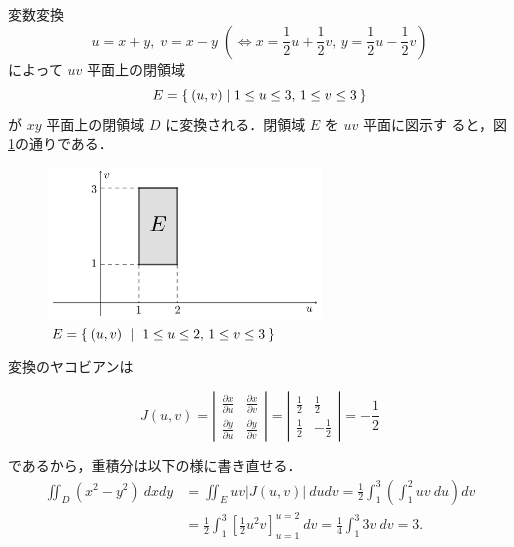 \documentclass[11pt, uplatex, dvipdfmx]{jsarticle}
\begin{document}
\begin{enumerate}[(1)]
     変数変換
     \[
       u=x+y, \; v=x-y \; \left( \Leftrightarrow x= \frac{1}{2}u+\frac{1}{2}v, \, y=\frac{1}{2}u - \frac{1}{2}v \right)
     \]
     によって $uv$ 平面上の閉領域
     \[
       E=\Set{ (u,v)  |  1 \leq u \leq 3, \, 1 \leq v \leq 3}
     \]
     が $xy$ 平面上の閉領域 $D$ に変換される．閉領域 $E$ を $uv$ 平面に図示す
     ると，図\ref{fig:no8uv}の通りである．
     \begin{figure}[h]
       \centering
       \includegraphics[height=4cm]{./pictures/no8uv.pdf}
       \caption{$E=\Set{(u,v) \ | \ 1 \leq u \leq 2, \, 1 \leq v \leq 3 }$}\label{fig:no8uv}
     \end{figure}
     
     変換のヤコビアンは
     \begin{spacing}{1.3}
       \[
         J(u, v) = \left|
           \begin{array}{cc}
             \frac{\partial x}{\partial u} & \frac{\partial x}{\partial v}\\
             \frac{\partial y}{\partial u} & \frac{\partial y}{\partial v}
           \end{array}
         \right| = \left|
           \begin{array}{rr}
             \frac{1}{2} & \frac{1}{2}\\
             \frac{1}{2} & -\frac{1}{2}
           \end{array}
         \right| = -\frac{1}{2}
       \]
     \end{spacing}
     であるから，重積分は以下の様に書き直せる．
     \begin{align*}
       \iint_D (x^2-y^2) \ dx dy 
       &= \iint_E uv |J(u,v)| \ du dv =\frac{1}{2} \int_{1}^{3}\left( \int_{1}^{2} uv \ du \right)dv\\
       &=\frac{1}{2} \int_1^3 \left[ \frac{1}{2} u^2 v \right]_{u=1}^{u=2} \ dv 
         =\frac{1}{4} \int_{1}^{3} 3v \ dv = 3.
     \end{align*}
     

\end{enumerate}
\end{document}
